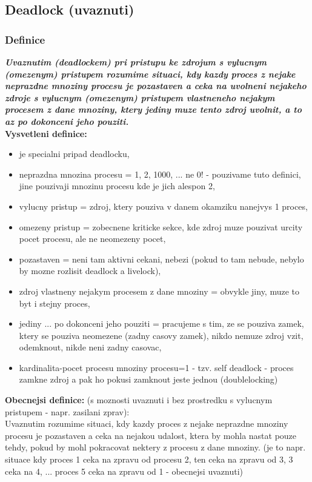 \documentclass[a4paper, 11pt]{article}
\begin{document}
\newpage

\subsection{Deadlock (uvaznuti)}
\subsubsection{Definice}
\textbf{\textit{Uvaznutim (deadlockem) pri pristupu ke zdrojum s vylucnym (omezenym) pristupem rozumime situaci, kdy kazdy proces z nejake neprazdne mnoziny procesu je pozastaven a ceka na uvolneni nejakeho zdroje s vylucnym (omezenym) pristupem vlastneneho nejakym procesem z dane mnoziny, ktery jediny muze tento zdroj uvolnit, a to az po dokonceni jeho pouziti.}} \\

\textbf{Vysvetleni definice:}
\begin{itemize}
    \item je specialni pripad deadlocku,
    \item neprazdna mnozina procesu = 1, 2, 1000, ... ne 0! - pouzivame tuto definici, jine pouzivaji mnozinu procesu kde je jich alespon 2,
    \item vylucny pristup = zdroj, ktery pouziva v danem okamziku nanejvys 1 proces,
    \item omezeny pristup = zobecnene kriticke sekce, kde zdroj muze pouzivat urcity pocet procesu, ale ne neomezeny pocet,
    \item pozastaven = neni tam aktivni cekani, nebezi (pokud to tam nebude, nebylo by mozne rozlisit deadlock a livelock),
    \item zdroj vlastneny nejakym procesem z dane mnoziny = obvykle jiny, muze to byt i stejny proces,
    \item jediny ... po dokonceni jeho pouziti = pracujeme s tim, ze se pouziva zamek, ktery se pouziva neomezene (zadny casovy zamek), nikdo nemuze zdroj vzit, odemknout, nikde neni zadny casovac,
    \item kardinalita-pocet procesu mnoziny procesu=1 - tzv. self deadlock - proces zamkne zdroj a pak ho pokusi zamknout jeste jednou (doublelocking) \\
\end{itemize}

\textbf{Obecnejsi definice:} (s moznosti uvaznuti i bez prostredku s vylucnym pristupem - napr. zasilani zprav): \\
Uvaznutim rozumime situaci, kdy kazdy proces z nejake neprazdne mnoziny procesu je pozastaven a ceka na nejakou udalost, ktera by mohla nastat pouze tehdy, pokud by mohl pokracovat nektery z procesu z dane mnoziny. (je to napr. situace kdy proces 1 ceka na zpravu od procesu 2, ten ceka na zpravu od 3, 3 ceka na 4, ... proces 5 ceka na zpravu od 1 - obecnejsi uvaznuti)
\end{document}
